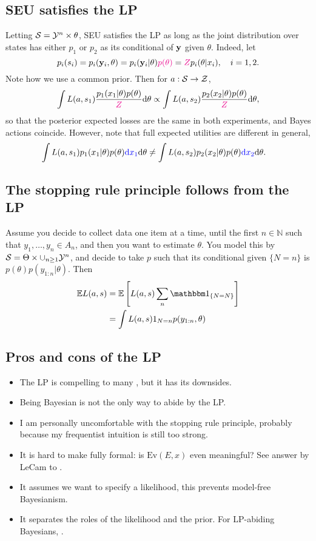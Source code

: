 \subsection{SEU satisfies the LP}
Letting $\mathcal{S} = \mathcal{Y}^n\times\theta$, SEU satisfies the LP as long as the joint distribution over states has either $p_1$ or $p_2$ as its conditional of $\mathbf{y}$ given $\theta$.
Indeed, let
$$
p_i(s_i) = p_i(\mathbf{y}_i,\theta) = p_i(\mathbf{y}_i\vert\theta)\textcolor{magenta}{p(\theta)} = \textcolor{magenta}{Z} p_i(\theta\vert x_i), \quad i=1,2.
$$
Note how we use a common prior. 
Then for $a:\mathcal{S}\rightarrow\mathcal{Z}$,
  $$ 
  \int L(a,s_1) \frac{p_1(x_1\vert\theta)p(\theta)}{\textcolor{magenta}{Z}} \mathrm{d}\theta \propto \int L(a,s_2) \frac{p_2(x_2\vert\theta)p(\theta)}{\textcolor{magenta}{Z}} \mathrm{d}\theta, 
  $$
  so that the posterior expected losses are the same in both experiments, and Bayes actions coincide.
  However, note that full expected utilities are different in general, 
  \begin{align*}
    \int L(a,s_1) p_1(x_1\vert\theta)p(\theta) \textcolor{blue}{\mathrm{d} x_1}\mathrm{d}\theta
    &\neq \int L(a,s_2) p_2(x_2\vert\theta)p(\theta) \textcolor{blue}{\mathrm{d} x_2}\mathrm{d}\theta.
  \end{align*}

\subsection{The stopping rule principle follows from the LP}
Assume you decide to collect data one item at a time, until the first $n\in\mathbb{N}$ such that $y_1,\dots,y_n \in A_n$, and then you want to estimate $\theta$. 
You model this by $\mathcal{S} = \Theta \times \cup_{n\geq 1} \mathcal{Y}^n$, and decide to take $p$ such that its conditional given $\{N=n\}$ is $p(\theta)p(y_{1:n}\vert \theta)$. 
Then
\begin{align*}
   \mathbb E L(a,s) &= \mathbb E \left [ L(a,s) \sum_{n} \IND{N=N} \right ]\\
    &= \int L(a,s) 1_{N=n} p(y_{1:n},\theta)  
\end{align*}


\subsection{Pros and cons of the LP}
\begin{itemize}
  \item The LP is compelling to many \citep{BeWo88}, but it has its downsides.
  \item Being Bayesian is not the only way to abide by the LP.
  \item I am personally uncomfortable with the stopping rule principle, probably because my frequentist intuition is still too strong.
  \item It is hard to make fully formal: is $\text{Ev}(E,x)$ even meaningful? See answer by LeCam to \citep{BeWo88}.
  \item It assumes we want to specify a likelihood, this prevents model-free Bayesianism.
  \item It separates the roles of the likelihood and the prior. For LP-abiding Bayesians, .
\end{itemize}

